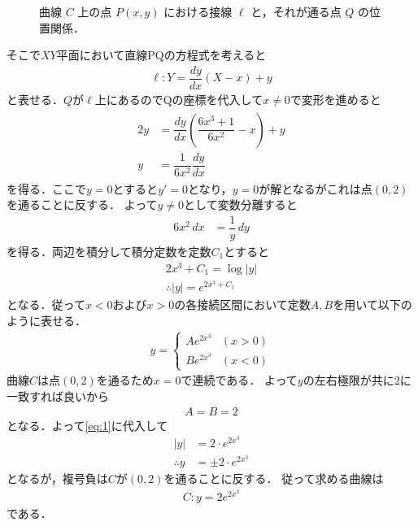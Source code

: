 \documentclass[../../main.tex]{subfiles}
\begin{document}
\begin{figure}[htb]
\begin{center}
  \end{center}
  \caption{曲線 $C$ 上の点 $P(x,y)$ における接線 $\ell$ と，それが通る点 $Q$ の位置関係．}
\end{figure}

そこで$XY$平面において直線PQの方程式を考えると
\begin{align}
  \ell: Y=\dfrac{dy}{dx}(X-x)+y
\end{align}
と表せる．$Q$が$\ell$上にあるのでQの座標を代入して$x\neq 0$で変形を進めると
\begin{align}
  \begin{split}
    2y&=\dfrac{dy}{dx}\left(\dfrac{6x^3+1}{6x^2}-x\right)+y \\
    y&=\dfrac{1}{6x^2}\dfrac{dy}{dx}
  \end{split}
\end{align}
を得る．ここで$y=0$とすると$y'=0$となり，$y=0$が解となるがこれは点$(0,2)$を通ることに反する．
よって$y\neq 0$として変数分離すると
\begin{align}
  6x^2\,dx&=\dfrac{1}{y}\,dy
\end{align}
を得る．両辺を積分して積分定数を定数$C_1$とすると
\begin{align}
  2x^3+C_1=\log|y| \\
  \therefore
  |y| = e^{2x^3+C_1}
\end{align}
となる．従って$x<0$および$x>0$の各接続区間において定数$A,B$を用いて以下のように表せる．
\begin{align}
  y =
  \begin{cases}
    Ae^{2x^3} & (x>0)\\
    Be^{2x^3} & (x<0)
  \end{cases} \label{eq:1}
\end{align}
曲線$C$は点$(0,2)$を通るため$x=0$で連続である．
よって$y$の左右極限が共に$2$に一致すれば良いから
\begin{align}
  A = B = 2
\end{align}
となる．よって\cref{eq:1}に代入して
\begin{align}
  |y|&=2\cdot e^{2x^3} \\
  \therefore
  y&=\pm 2\cdot e^{2x^3}
\end{align}
となるが，複号負は$C$が$(0,2)$を通ることに反する．
従って求める曲線は
\begin{align}
  C: y=2e^{2x^3}
\end{align}
である．

\newpage
\end{document}
